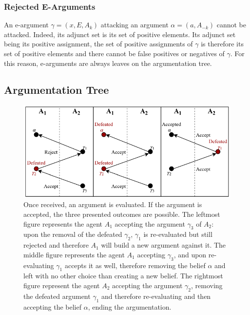 \subsubsection{Rejected E-Arguments}

An e-argument $\gamma = (x,E,A_{k})$ attacking an argument $\alpha = (a,A_{-k})$ cannot be attacked. Indeed, its adjunct set is its set of positive elements. Its adjunct set being its positive assignment, the set of positive assignments of $\gamma$ is therefore its set of positive elements and there cannot be false positives or negatives of $\gamma$. For this reason, e-arguments are always leaves on the argumentation tree.

\subsection{Argumentation Tree}

\begin{figure}
    \centering
    \includegraphics[width=\textwidth]{figs/Resolution.pdf}
    \caption{Once received, an argument is evaluated. If the argument is accepted, the three presented outcomes are possible. The leftmost figure represents the agent $A_{1}$ accepting the argument $\gamma_{3}$ of $A_{2}$: upon the removal of the defeated $\gamma_{2}$, $\gamma_{1}$ is re-evaluated but still rejected and therefore $A_{1}$ will build a new argument against it. The middle figure represents the agent $A_{1}$ accepting $\gamma_{3}$, and upon re-evaluating $\gamma_{1}$ accepts it as well, therefore removing the belief $\alpha$ and left with no other choice than creating a new belief. The rightmost figure represent the agent $A_{2}$ accepting the argument $\gamma_{2}$, removing the defeated argument $\gamma_{1}$ and therefore re-evaluating and then accepting the belief $\alpha$, ending the argumentation.}
    \label{fig:Resolution}
\end{figure}

